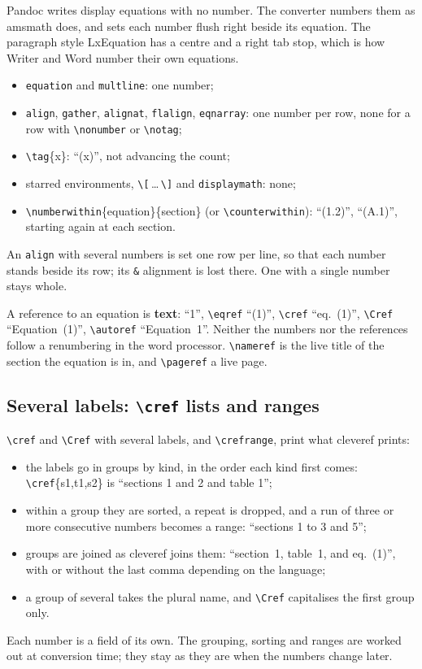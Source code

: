 \documentclass[11pt,a4paper]{article}
\newcommand{\cs}[1]{\texttt{\textbackslash #1}}
\newcommand{\sty}[1]{\textsf{#1}}
\newcommand{\pkg}[1]{\textsf{#1}}
\begin{document}
Pandoc writes display equations with no number. The converter numbers them as
\pkg{amsmath} does, and sets each number flush right beside its equation.
The paragraph style \sty{LxEquation} has a centre and a right tab stop, which
is how Writer and Word number their own equations.
\begin{itemize}[nosep]
\item \texttt{equation} and \texttt{multline}: one number;
\item \texttt{align}, \texttt{gather}, \texttt{alignat}, \texttt{flalign},
  \texttt{eqnarray}: one number per row, none for a row with \cs{nonumber}
  or \cs{notag};
\item \cs{tag}\{x\}: ``(x)'', not advancing the count;
\item starred environments, \cs{[}\,\ldots\,\cs{]} and \texttt{displaymath}: none;
\item \cs{numberwithin}\{equation\}\{section\} (or \cs{counterwithin}):
  ``(1.2)'', ``(A.1)'', starting again at each section.
\end{itemize}
An \texttt{align} with several numbers is set one row per line, so that each
number stands beside its row; its \texttt{\&} alignment is lost there. One
with a single number stays whole.

A reference to an equation is \textbf{text}: ``1'', \cs{eqref} ``(1)'',
\cs{cref} ``eq.~(1)'', \cs{Cref} ``Equation~(1)'', \cs{autoref} ``Equation~1''.
Neither the numbers nor the references follow a renumbering in the word
processor. \cs{nameref} is the live title of the section the equation is in,
and \cs{pageref} a live page.

\subsection{Several labels: \cs{cref} lists and ranges}

\cs{cref} and \cs{Cref} with several labels, and \cs{crefrange}, print what
\pkg{cleveref} prints:
\begin{itemize}[nosep]
\item the labels go in groups by kind, in the order each kind first comes:
  \cs{cref}\{s1,t1,s2\} is ``sections 1 and 2 and table 1'';
\item within a group they are sorted, a repeat is dropped, and a run of three
  or more consecutive numbers becomes a range: ``sections 1 to 3 and 5'';
\item groups are joined as \pkg{cleveref} joins them: ``section~1, table~1,
  and eq.~(1)'', with or without the last comma depending on the language;
\item a group of several takes the plural name, and \cs{Cref} capitalises the
  first group only.
\end{itemize}
Each number is a field of its own. The grouping, sorting and ranges are
worked out at conversion time; they stay as they are when the numbers change
later.
\end{document}
